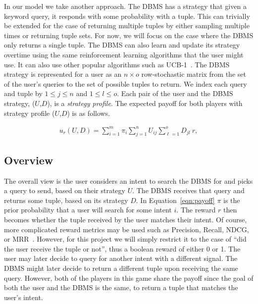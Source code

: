 \documentclass{article}
\begin{document}
In our model we take another approach. The DBMS has a strategy that given a keyword query, it responds with some probability with a tuple. This can trivially be extended for the case of returning multiple tuples by either sampling multiple times or returning tuple sets. For now, we will focus on the case where the DBMS only returns a single tuple. The DBMS can also learn and update its strategy overtime using the same reinforcement learning algorithms that the user might use. It can also use other popular algorithms such as UCB-1~\cite{auer2002finite,vorobev2015gathering, radlinski2008learning, moon2012online}. The DBMS strategy is represented for a user as an $n\times o$ row-stochastic matrix from the set of the user's queries to the set of possible tuples to return. We index each query and tuple by $1 \leq j \leq n$ and $1 \leq l \leq o$. Each pair of the user and the DBMS strategy, ($U$,$D$), is a {\it strategy profile}. The expected payoff for both players with strategy profile ($U$,$D$) is as follows.

\begin{align}
\label{eqn:payoff}
u_{r}(U,D) =\sum_{i=1}^m\pi_i\sum_{j=1}^nU_{ij}\sum_{\ell=1}^o D_{jl}\ r, 
\end{align}

\subsection{Overview}
The overall view is the user considers an intent to search the DBMS for and picks a query to send, based on their strategy $U$. The DBMS receives that query and returns some tuple, based on its strategy $D$.  In Equation~\ref{eqn:payoff} $\pi$ is the prior probability that a user will search for some intent $i$. The reward $r$ then becomes whether the tuple received by the user matches their intent. Of course, more complicated reward metrics may be used such as Precision, Recall, NDCG, or MRR~\cite{IRStyle,IRBook}. However, for this project we will simply restrict it to the case of ``did the user receive the tuple or not'', thus a boolean reward of either 0 or 1. The user may later decide to query for another intent with a different signal. The DBMS might later decide to return a different tuple upon receiving the same query. However, both of the players in this game share the payoff since the goal of both the user and the DBMS is the same, to return a tuple that matches the user's intent.
\end{document}
